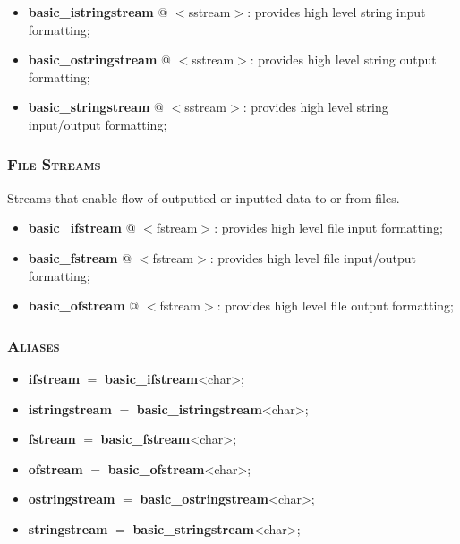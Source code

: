 \documentclass[10pt]{article}
\begin{document}
\begin{multicols*}{5}
{\begin{itemize}[leftmargin=*,topsep=0.25pt]
  \setlength\itemsep{-1.8pt}
	\item \textbf{basic\_istringstream} @ $<$sstream$>$: provides high level string input formatting;
	\item \textbf{basic\_ostringstream} @ $<$sstream$>$: provides high level string output formatting;
	\item \textbf{basic\_stringstream} @ $<$sstream$>$: provides high level string input/output formatting;
\end{itemize}


\subsubsection*{\textsc{File Streams}} 
\noindent
Streams that enable flow of outputted or inputted data to or from files.

\begin{itemize}[leftmargin=*,topsep=0.25pt]
  \setlength\itemsep{-1.8pt}
	\item \textbf{basic\_ifstream} @ $<$fstream$>$: provides high level file input formatting;
	\item \textbf{basic\_fstream} @ $<$fstream$>$: provides high level file input/output formatting;
	\item \textbf{basic\_ofstream} @ $<$fstream$>$: provides high level file output formatting;
\end{itemize}

\subsubsection*{\textsc{Aliases}} 
\begin{itemize}[leftmargin=*,topsep=0.25pt]
  \setlength\itemsep{-1.8pt}
	\item \textbf{ifstream} $=$ \textbf{basic\_ifstream}<char>;
	\item \textbf{istringstream} $=$ \textbf{basic\_istringstream}<char>;
	\item \textbf{fstream} $=$ \textbf{basic\_fstream}<char>;
	\item \textbf{ofstream} $=$ \textbf{basic\_ofstream}<char>;
	\item \textbf{ostringstream} $=$ \textbf{ba\-sic\_o\-string\-stream}\-<char>;
	\item \textbf{stringstream} $=$ \textbf{basic\_stringstream}<char>;
\end{itemize}


}
\end{multicols*}
\end{document}
